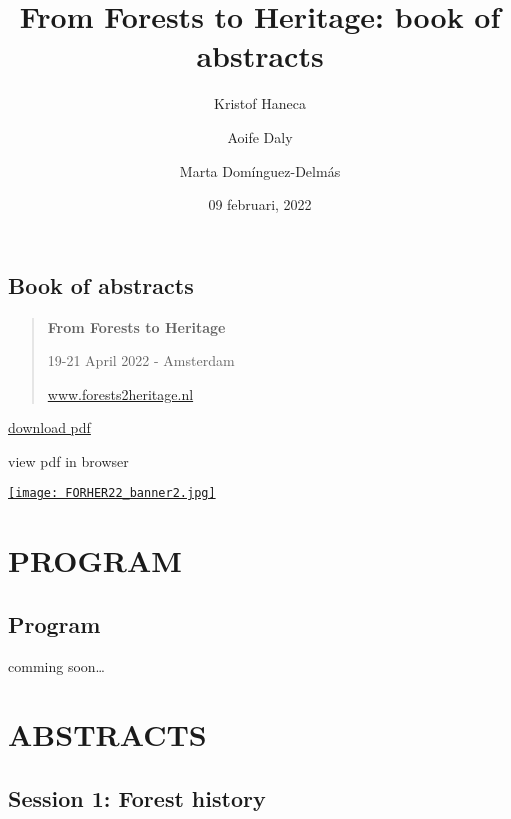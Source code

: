 \documentclass[
]{book}
\title{From Forests to Heritage: book of abstracts}
\author{Kristof Haneca \and Aoife Daly \and Marta Domínguez-Delmás}
\date{09 februari, 2022}
\begin{document}
\maketitle

{
\setcounter{tocdepth}{1}
\tableofcontents
}
\hypertarget{book-of-abstracts}{%
\chapter*{Book of abstracts}\label{book-of-abstracts}}

\begin{quote}
\textbf{From Forests to Heritage}

19-21 April 2022 - Amsterdam

\href{https://event.forests2heritage.nl/}{www.forests2heritage.nl}
\end{quote}

\href{https://github.com/hanecakr/forests2heritage/raw/main/docs/forests2heritage.pdf}{download pdf}

view pdf in browser

\href{https://event.forests2heritage.nl/}{\texttt{[image: FORHER22\_banner2.jpg]}}

\hypertarget{part-program}{%
\part*{PROGRAM}\label{part-program}}

\hypertarget{program}{%
\chapter*{Program}\label{program}}

comming soon\ldots{}

\hypertarget{part-abstracts}{%
\part*{ABSTRACTS}\label{part-abstracts}}

\hypertarget{session-1-forest-history}{%
\chapter*{Session 1: Forest history}\label{session-1-forest-history}}
\end{document}
